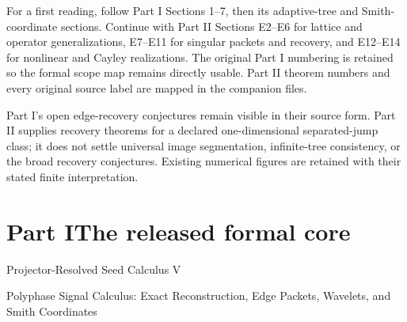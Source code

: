 \documentclass[11pt,a4paper]{article}
\theoremstyle{definition}
\theoremstyle{remark}
\begin{document}
For a first reading, follow Part I Sections 1--7, then its adaptive-tree and Smith-coordinate sections. Continue with Part II Sections E2--E6 for lattice and operator generalizations, E7--E11 for singular packets and recovery, and E12--E14 for nonlinear and Cayley realizations. The original Part I numbering is retained so the formal scope map remains directly usable. Part II theorem numbers and every original source label are mapped in the companion files.

Part I's open edge-recovery conjectures remain visible in their source form. Part II supplies recovery theorems for a declared one-dimensional separated-jump class; it does not settle universal image segmentation, infinite-tree consistency, or the broad recovery conjectures. Existing numerical figures are retained with their stated finite interpretation.
\clearpage
\tableofcontents
\clearpage
\listoffigures
\listoftables
\clearpage
\part*{Part I\quad The released formal core}
\begin{center}\large Projector-Resolved Seed Calculus V\par\normalsize Polyphase Signal Calculus: Exact Reconstruction, Edge Packets, Wavelets, and Smith Coordinates\end{center}
\end{document}

